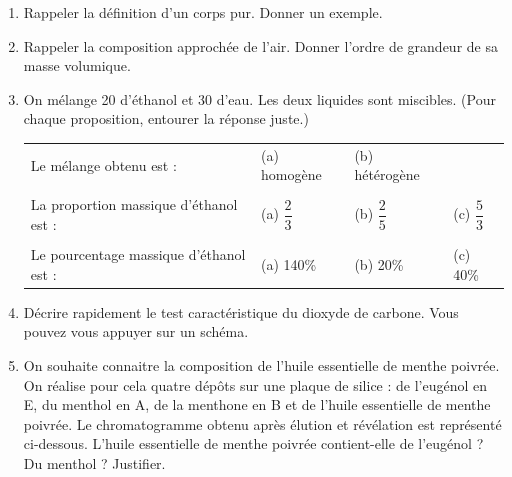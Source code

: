 \begin{enumerate}
\item \rco{} Rappeler la définition d'un corps pur.
Donner un exemple.

\item \rco{} Rappeler la composition approchée de l'air.
Donner l'ordre de grandeur de sa masse volumique.

\item \rco{} \rea{} On mélange \unit{20}{\gram} d'éthanol et \unit{30}{\gram} d'eau.
Les deux liquides sont miscibles.
(Pour chaque proposition, entourer la réponse juste.)

\begin{tabular}{llll}
Le mélange obtenu est : & (a) homogène & (b) hétérogène & \\ \\
La proportion massique d'éthanol est : & (a) $\dfrac{2}{3}$ & (b) $\dfrac{2}{5}$ & (c) $\dfrac{5}{3}$ \\ \\
Le pourcentage massique d'éthanol est : & (a) \unit{140}{\%} & (b) \unit{20}{\%} & (c) \unit{40}{\%}
\end{tabular}

\item \rco{} \com{} Décrire rapidement le test caractéristique du dioxyde de carbone.
Vous pouvez vous appuyer sur un schéma.

\item \rco{} \rea{} On souhaite connaitre la composition de l'huile essentielle de menthe poivrée.
On réalise pour cela quatre dépôts sur une plaque de silice : de l'eugénol en E, du menthol en A, de la menthone en B et de l'huile essentielle de menthe poivrée.
Le chromatogramme obtenu après élution et révélation est représenté ci-dessous.
L'huile essentielle de menthe poivrée contient-elle de l'eugénol ?
Du menthol ?
Justifier.


\end{enumerate}
